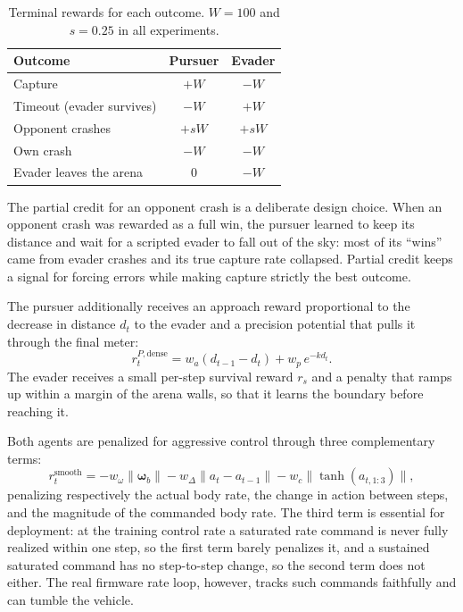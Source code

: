 \begin{table}[t]
    \caption[Terminal rewards]{Terminal rewards for each outcome. $W = 100$ and $s = 0.25$ in all experiments.}
    \label{tab:terminal}
    \begin{center}
        \begin{tabular}{lcc}
            \hline\hline
            Outcome                   & Pursuer & Evader \\
            \hline
            Capture                   & $+W$    & $-W$   \\
            Timeout (evader survives) & $-W$    & $+W$   \\
            Opponent crashes          & $+sW$   & $+sW$  \\
            Own crash                 & $-W$    & $-W$   \\
            Evader leaves the arena   & $0$     & $-W$   \\
            \hline\hline
        \end{tabular}
    \end{center}
\end{table}

The partial credit for an opponent crash is a deliberate design choice. When an opponent crash was rewarded as a full win, the pursuer learned to keep its distance and wait for a scripted evader to fall out of the sky: most of its ``wins'' came from evader crashes and its true capture rate collapsed. Partial credit keeps a signal for forcing errors while making capture strictly the best outcome.

The pursuer additionally receives an approach reward proportional to the decrease in distance $d_t$ to the evader and a precision potential that pulls it through the final meter:
\begin{equation}
    r^{P,\text{dense}}_t = w_a (d_{t-1} - d_t) + w_p\, e^{-k d_t}.
\end{equation}
The evader receives a small per-step survival reward $r_s$ and a penalty that ramps up within a margin of the arena walls, so that it learns the boundary before reaching it.

Both agents are penalized for aggressive control through three complementary terms:
\begin{equation}
    r^{\text{smooth}}_t = - w_\omega \|\boldsymbol{\omega}_b\| - w_{\Delta} \|a_t - a_{t-1}\| - w_c \|\tanh(a_{t,1:3})\|,
\end{equation}
penalizing respectively the actual body rate, the change in action between steps, and the magnitude of the commanded body rate. The third term is essential for deployment: at the training control rate a saturated rate command is never fully realized within one step, so the first term barely penalizes it, and a sustained saturated command has no step-to-step change, so the second term does not either. The real firmware rate loop, however, tracks such commands faithfully and can tumble the vehicle.

